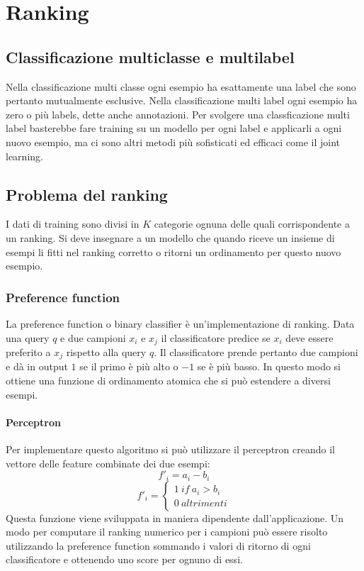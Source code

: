 \chapter{Ranking}

\section{Classificazione multiclasse e multilabel}
Nella classificazione multi classe ogni esempio ha esattamente una label che sono pertanto mutualmente esclusive.
Nella classificazione multi label ogni esempio ha zero o pi\`u labels, dette anche annotazioni.
Per svolgere una classficazione multi label basterebbe fare training su un modello per ogni label e applicarli a ogni nuovo esempio, ma ci sono altri metodi pi\`u sofisticati ed efficaci come il joint learning.

\section{Problema del ranking}
I dati di training sono divisi in $K$ categorie ognuna delle quali corrispondente a un ranking.
Si deve insegnare a un modello che quando riceve un insieme di esempi li fitti nel ranking corretto o ritorni un ordinamento per questo nuovo esempio.

	\subsection{Preference function}
	La preference function o binary classifier \`e un'implementazione di ranking.
	Data una query $q$ e due campioni $x_i$ e $x_j$ il classificatore predice se $x_i$ deve essere preferito a $x_j$ rispetto alla query $q$.
	Il classificatore prende pertanto due campioni e d\`a in output $1$ se il primo \`e pi\`u alto o $-1$ se \`e pi\`u basso.
	In questo modo si ottiene una funzione di ordinamento atomica che si pu\`o estendere a diversi esempi.

		\subsubsection{Perceptron}
		Per implementare questo algoritmo si pu\`o utilizzare il perceptron creando il vettore delle feature combinate dei due esempi:
		$$f'_i = a_i -b_i$$
		$$f'_i = \begin{cases}1\ if\ a_i > b_i\\0\ altrimenti\end{cases}$$
		Questa funzione viene sviluppata in maniera dipendente dall'applicazione.
		Un modo per computare il ranking numerico per i campioni pu\`o essere risolto utilizzando la preference function sommando i valori di ritorno di ogni classificatore e ottenendo uno score per ognuno di essi.

